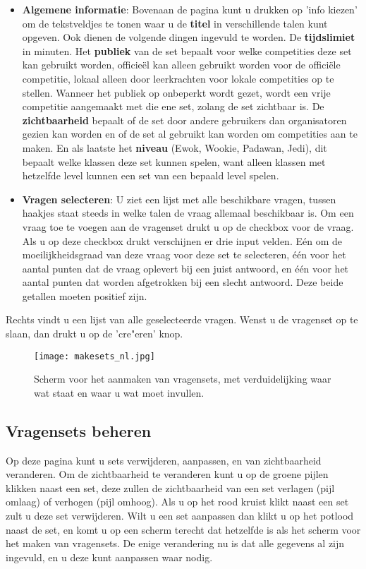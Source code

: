 \documentclass[11pt,a4paper]{report}
\begin{document}
\begin{itemize}
\item \textbf{Algemene informatie}: Bovenaan de pagina kunt u drukken op 'info kiezen' om de tekstveldjes te tonen waar u de \textbf{titel} in verschillende talen kunt opgeven. Ook dienen de volgende dingen ingevuld te worden. De \textbf{tijdslimiet} in minuten. Het \textbf{publiek} van de set bepaalt voor welke competities deze set kan gebruikt worden, officie\"el kan alleen gebruikt worden voor de offici\"ele competitie, lokaal alleen door leerkrachten voor lokale competities op te stellen. Wanneer het publiek op onbeperkt wordt gezet, wordt een vrije competitie aangemaakt met die ene set, zolang de set zichtbaar is. De \textbf{zichtbaarheid} bepaalt of de set door andere gebruikers dan organisatoren gezien kan worden en of de set al gebruikt kan worden om competities aan te maken. En als laatste het \textbf{niveau} (Ewok, Wookie, Padawan, Jedi), dit bepaalt welke klassen deze set kunnen spelen, want alleen klassen met hetzelfde level kunnen een set van een bepaald level spelen.

\item \textbf{Vragen selecteren}: U ziet een lijst met alle beschikbare vragen, tussen haakjes staat steeds in welke talen de vraag allemaal beschikbaar is. Om een vraag toe te voegen aan de vragenset drukt u op de checkbox voor de vraag. Als u op deze checkbox drukt verschijnen er drie input velden. E\'en om de moeilijkheidsgraad van deze vraag voor deze set te selecteren, \'e\'en voor het aantal punten dat de vraag oplevert bij een juist antwoord, en \'e\'en voor het aantal punten dat worden afgetrokken bij een slecht antwoord. Deze beide getallen moeten positief zijn. 
\end{itemize}
Rechts vindt u een lijst van alle geselecteerde vragen. Wenst u de vragenset op te slaan, dan drukt u op de 'cre"eren' knop.

\begin{figure}[h!]
\centering
\texttt{[image: makesets\_nl.jpg]}
\caption{Scherm voor het aanmaken van vragensets, met verduidelijking waar wat staat en waar u wat moet invullen.}
\label{fig:makesets}
\end{figure}

\subsection{Vragensets beheren}
Op deze pagina kunt u sets verwijderen, aanpassen, en van zichtbaarheid veranderen.
Om de zichtbaarheid te veranderen kunt u op de groene pijlen klikken naast een set, deze zullen de zichtbaarheid van een set verlagen (pijl omlaag) of verhogen (pijl omhoog). Als u op het rood kruist klikt naast een set zult u deze set verwijderen. Wilt u een set aanpassen dan klikt u op het potlood naast de set, en komt u op een scherm terecht dat hetzelfde is als het scherm voor het maken van vragensets. De enige verandering nu is dat alle gegevens al zijn ingevuld, en u deze kunt aanpassen waar nodig.
\end{document}
